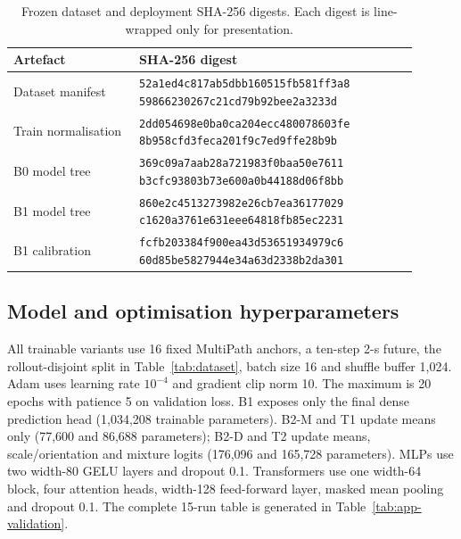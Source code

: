 \begin{table}[h]
  \centering\small
  \caption{Frozen dataset and deployment SHA-256 digests. Each digest is
  line-wrapped only for presentation.}
  \label{tab:app-hashes}
  \begin{tabular}{@{}L{0.28\linewidth}L{0.62\linewidth}@{}}
    \toprule
    Artefact & SHA-256 digest \\
    \midrule
    Dataset manifest &
    \texttt{52a1ed4c817ab5dbb160515fb581ff3a8}\newline
    \texttt{59866230267c21cd79b92bee2a3233d} \\
    Train normalisation &
    \texttt{2dd054698e0ba0ca204ecc480078603fe}\newline
    \texttt{8b958cfd3feca201f9c7ed9ffe28b9b} \\
    B0 model tree &
    \texttt{369c09a7aab28a721983f0baa50e7611}\newline
    \texttt{b3cfc93803b73e600a0b44188d06f8bb} \\
    B1 model tree &
    \texttt{860e2c4513273982e26cb7ea36177029}\newline
    \texttt{c1620a3761e631eee64818fb85ec2231} \\
    B1 calibration &
    \texttt{fcfb203384f900ea43d53651934979c6}\newline
    \texttt{60d85be5827944e34a63d2338b2da301} \\
    \bottomrule
  \end{tabular}
\end{table}

\subsection{Model and optimisation hyperparameters}

All trainable variants use 16 fixed MultiPath anchors, a ten-step 2-s future,
the rollout-disjoint split in Table~\ref{tab:dataset}, batch size 16 and shuffle
buffer 1,024. Adam uses learning rate $10^{-4}$ and gradient clip norm 10. The
maximum is 20 epochs with patience 5 on validation loss. B1 exposes only the
final dense prediction head (1,034,208 trainable parameters). B2-M and T1
update means only (77,600 and 86,688 parameters); B2-D and T2 update means,
scale/orientation and mixture logits (176,096 and 165,728 parameters). MLPs use
two width-80 GELU layers and dropout 0.1. Transformers use one width-64 block,
four attention heads, width-128 feed-forward layer, masked mean pooling and
dropout 0.1. The complete 15-run table is generated in
Table~\ref{tab:app-validation}.

